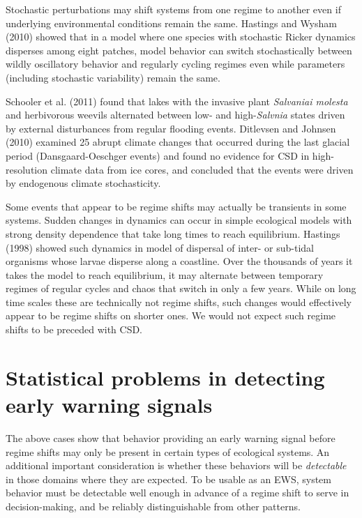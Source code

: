 \documentclass[author-year, review]{elsarticle} %
\begin{document}
Stochastic perturbations may shift systems from one regime to another
even if underlying environmental conditions remain the same. Hastings
and Wysham (2010) showed that in a model where one species with
stochastic Ricker dynamics disperses among eight patches, model behavior
can switch stochastically between wildly oscillatory behavior and
regularly cycling regimes even while parameters (including stochastic
variability) remain the same.

Schooler et al. (2011) found that lakes with the invasive plant
\emph{Salvaniai molesta} and herbivorous weevils alternated between low-
and high-\emph{Salvnia} states driven by external disturbances from
regular flooding events. Ditlevsen and Johnsen (2010) examined 25 abrupt
climate changes that occurred during the last glacial period
(Dansgaard-Oeschger events) and found no evidence for CSD in
high-resolution climate data from ice cores, and concluded that the
events were driven by endogenous climate stochasticity.

Some events that appear to be regime shifts may actually be transients
in some systems. Sudden changes in dynamics can occur in simple
ecological models with strong density dependence that take long times to
reach equilibrium. Hastings (1998) showed such dynamics in model of
dispersal of inter- or sub-tidal organisms whose larvae disperse along a
coastline. Over the thousands of years it takes the model to reach
equilibrium, it may alternate between temporary regimes of regular
cycles and chaos that switch in only a few years. While on long time
scales these are technically not regime shifts, such changes would
effectively appear to be regime shifts on shorter ones. We would not
expect such regime shifts to be preceded with CSD.

\section{Statistical problems in detecting early warning signals}

The above cases show that behavior providing an early warning signal
before regime shifts may only be present in certain types of ecological
systems. An additional important consideration is whether these
behaviors will be \emph{detectable} in those domains where they are
expected. To be usable as an EWS, system behavior must be detectable
well enough in advance of a regime shift to serve in decision-making,
and be reliably distinguishable from other patterns.
\end{document}

